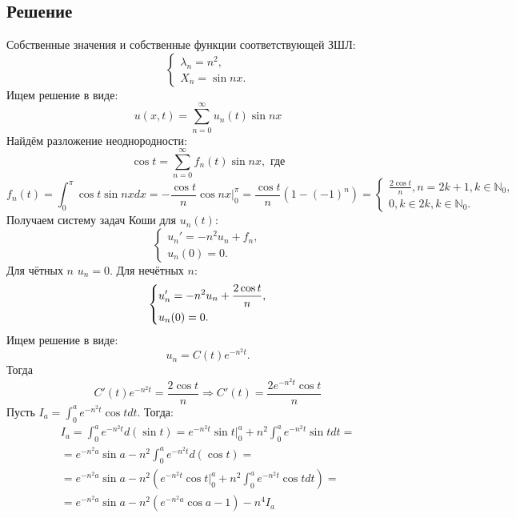 \documentclass[11pt]{article}
\begin{document}
\subsection{Решение}
\label{sec:orge66be29}
Собственные значения и собственные функции соответствующей ЗШЛ:
\begin{equation*}
\begin{cases}
\lambda_n = n^2, \\
X_n = \sin nx.
\end{cases}
\end{equation*}
Ищем решение в виде:
\begin{equation}
u(x, t) = \sum_{n = 0}^{\infty}u_n(t)\sin nx
\end{equation}
Найдём разложение неоднородности:
\begin{equation*}
\cos t = \sum_{n = 0}^{\infty}f_n(t)\sin nx, \text{ где}
\end{equation*}
\begin{equation*}
f_n(t) = \int_0^{\pi}\cos t\sin nxdx = -\frac{\cos t}n\cos{nx}|_0^{\pi}
= \frac{\cos t}n(1 - (-1)^n) = \begin{cases}
\frac{2\cos t}n, n = 2k + 1, k \in \mathbb{N}_0, \\
0, k \in 2k, k \in \mathbb{N}_0.
\end{cases}
\end{equation*}
Получаем систему задач Коши для $u_n(t)$:
\begin{equation}
\begin{cases}
u_n' = -n^2u_n + f_n, \\
u_n(0) = 0.
\end{cases}
\end{equation}
Для чётных $n$ $u_n = 0$. Для нечётных $n$:
\begin{equation*}
\begin{dcases}
u_n' = -n^2u_n + \frac{2\cos t}n, \\
u_n(0) = 0.
\end{dcases}
\end{equation*}
Ищем решение в виде:
\begin{equation*}
u_n = C(t)e^{-n^2t}.
\end{equation*}
Тогда
\begin{equation}
C'(t)e^{-n^2t} = \frac{2\cos t}n \Rightarrow C'(t) = \frac{2e^{-n^2t}\cos t}n
\end{equation}
Пусть $I_a = \int_0^ae^{-n^2t}\cos tdt$. Тогда:
\begin{multline*}
I_a = \int_0^ae^{-n^2t}d(\sin t) = e^{-n^2t}\sin t\bigg|_0^a + n^2\int_0^ae^{-n^2t}\sin tdt = \\
= e^{-n^2a}\sin a - n^2\int_0^ae^{-n^2t}d(\cos t) = \\
= e^{-n^2a}\sin a - n^2\left(e^{-n^2t}\cos t\bigg|_0^a + n^2\int_0^ae^{-n^2t}\cos tdt\right) = \\
= e^{-n^2a}\sin a - n^2(e^{-n^2a}\cos a - 1) - n^4I_a
\end{multline*}
\end{document}
